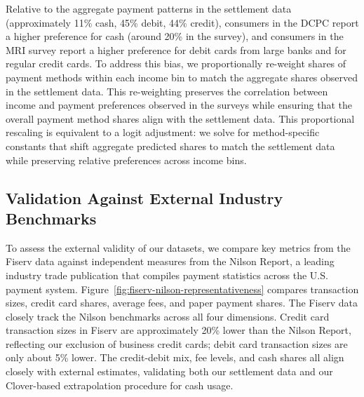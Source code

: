 \documentclass[11pt,english]{article}
\theoremstyle{remark}
\begin{document}
Relative to the aggregate payment patterns in the settlement data (approximately 11\% cash, 45\% debit, 44\% credit), consumers in the DCPC report a higher preference for cash (around 20\% in the survey), and consumers in the MRI survey report a higher preference for debit cards from large banks and for regular credit cards.
To address this bias, we proportionally re-weight shares of payment methods within each income bin to match the aggregate shares observed in the settlement data.
This re-weighting preserves the correlation between income and payment preferences observed in the surveys while ensuring that the overall payment method shares align with the settlement data.
This proportional rescaling is equivalent to a logit adjustment: we solve for method-specific constants that shift aggregate predicted shares to match the settlement data while preserving relative preferences across income bins.





\subsection{Validation Against External Industry Benchmarks}

To assess the external validity of our datasets, we compare key metrics from the Fiserv data against independent measures from the Nilson Report, a leading industry trade publication that compiles payment statistics across the U.S. payment system.
Figure~\ref{fig:fiserv-nilson-representativeness} compares transaction sizes, credit card shares, average fees, and paper payment shares.
The Fiserv data closely track the Nilson benchmarks across all four dimensions.
Credit card transaction sizes in Fiserv are approximately 20\% lower than the Nilson Report, reflecting our exclusion of business credit cards; debit card transaction sizes are only about 5\% lower.
The credit-debit mix, fee levels, and cash shares all align closely with external estimates, validating both our settlement data and our Clover-based extrapolation procedure for cash usage.

\clearpage
\end{document}
